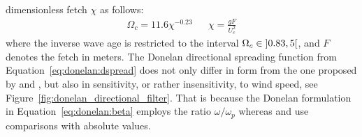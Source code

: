 dimensionless fetch $\chi$ as follows:
\begin{align}
\label{eq:donelan:omegac}
 \Omega_c = 11.6\chi^{-0.23} && \chi = \frac{gF}{U_{c}^{2}}
\end{align}
where the inverse wave age is restricted to
the interval ${\Omega_c\in\interval[open left, open right]{0.83}{5}}$,
and $F$ denotes the fetch in meters.
The Donelan directional spreading function from Equation~\ref{eq:donelan:dspread}
does not only differ in form from the one proposed by
\citet{article:Mitsuyasu1975} and \citet{article:Hasselmann1980},
but also in sensitivity, or rather insensitivity, to wind speed, see
Figure~\ref{fig:donelan_directional_filter}. That is because the Donelan
formulation in Equation~\ref{eq:donelan:beta} employs the ratio
$\omega/\omega_p$ whereas
\citeauthor{article:Mitsuyasu1975} and \citeauthor{article:Hasselmann1980}
use comparisons with absolute values.


